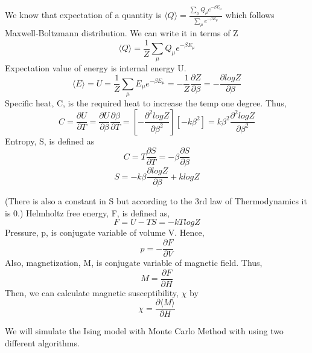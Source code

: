 \documentclass[12pt,fleqn]{report}
\begin{document}
We know that expectation of a quantity is $ \langle Q \rangle = \frac{\sum\limits_{\mu} Q_\mu e^{-\beta E_\mu}}{\sum\limits_{\mu} e^{-\beta E_\mu}}$ which follows Maxwell-Boltzmann distribution. We can write it in terms of Z
\begin{equation}
\langle Q\rangle = \frac{1}{Z}\sum\limits_{\mu} Q_\mu e^{-\beta E_\mu}
\end{equation}
Expectation value of energy is internal energy U. 
\begin{equation}
\langle E\rangle = U = \frac{1}{Z} \sum\limits_{\mu} E_\mu e^{-\beta E_\mu} = -\frac{1}{Z} \frac{\partial Z}{\partial \beta} = -\frac{\partial logZ}{\partial \beta}
\end{equation}
Specific heat, C, is the required heat to increase the temp one degree. Thus,
\begin{equation}
C = \frac{\partial U}{\partial T} = \frac{\partial U}{\partial \beta} \frac{\partial \beta}{\partial T} = \left[ - \frac{\partial^2 logZ}{\partial \beta^2}    \right] \left[ -k \beta^2       \right] = k \beta^2 \frac{\partial^2 logZ}{\partial \beta^2}
\end{equation}
Entropy, S, is defined as 
\begin{equation}
C = T \frac{\partial S}{\partial T} = -\beta \frac{\partial S}{\partial \beta}
\end{equation}
\begin{equation}
S = - k \beta \frac{\partial logZ}{\partial \beta}  + k log Z
\end{equation}

(There is also a constant in S but according to the 3rd law of Thermodynamics it is 0.)
Helmholtz free energy, F, is defined as,
\begin{equation}
F = U - TS = -kTlogZ
\end{equation}
Pressure, p, is conjugate variable of volume V. Hence,
\begin{equation}
p = - \frac{\partial F}{\partial V}
\end{equation}
Also, magnetization, M, is conjugate variable of magnetic field. Thus,
\begin{equation}
M = \frac{\partial F}{\partial H}
\end{equation}
Then, we can calculate magnetic susceptibility, $\chi$ by
\begin{equation}
\chi =\frac{\partial \langle M \rangle}{\partial H}
\end{equation}

We will simulate the Ising model with Monte Carlo Method with using two different algorithms.
\end{document}
